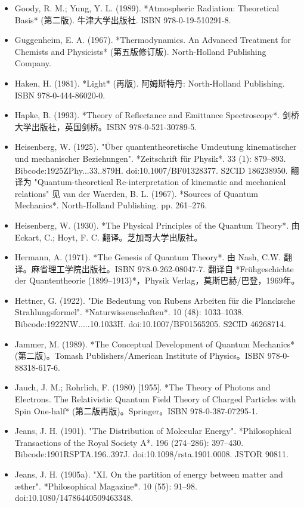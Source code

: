 \begin{itemize}
\item Goody, R. M.; Yung, Y. L. (1989). *Atmospheric Radiation: Theoretical Basis* (第二版). 牛津大学出版社. ISBN 978-0-19-510291-8.  
\item Guggenheim, E. A. (1967). *Thermodynamics. An Advanced Treatment for Chemists and Physicists* (第五版修订版). North-Holland Publishing Company.  
\item Haken, H. (1981). *Light* (再版). 阿姆斯特丹: North-Holland Publishing. ISBN 978-0-444-86020-0.
\item Hapke, B. (1993). *Theory of Reflectance and Emittance Spectroscopy*. 剑桥大学出版社，英国剑桥。ISBN 978-0-521-30789-5.  
\item Heisenberg, W. (1925). "Über quantentheoretische Umdeutung kinematischer und mechanischer Beziehungen". *Zeitschrift für Physik*. 33 (1): 879–893. Bibcode:1925ZPhy...33..879H. doi:10.1007/BF01328377. S2CID 186238950.  
  翻译为 "Quantum-theoretical Re-interpretation of kinematic and mechanical relations" 见 van der Waerden, B. L. (1967). *Sources of Quantum Mechanics*. North-Holland Publishing. pp. 261–276.  
\item Heisenberg, W. (1930). *The Physical Principles of the Quantum Theory*. 由 Eckart, C.; Hoyt, F. C. 翻译。芝加哥大学出版社。  
\item Hermann, A. (1971). *The Genesis of Quantum Theory*. 由 Nash, C.W. 翻译。麻省理工学院出版社。ISBN 978-0-262-08047-7.  
  翻译自 *Frühgeschichte der Quantentheorie (1899–1913)*，Physik Verlag，莫斯巴赫/巴登，1969年。  
\item Hettner, G. (1922). "Die Bedeutung von Rubens Arbeiten für die Plancksche Strahlungsformel". *Naturwissenschaften*. 10 (48): 1033–1038. Bibcode:1922NW.....10.1033H. doi:10.1007/BF01565205. S2CID 46268714.  
\item Jammer, M. (1989). *The Conceptual Development of Quantum Mechanics* (第二版)。Tomash Publishers/American Institute of Physics。ISBN 978-0-88318-617-6.  
\item Jauch, J. M.; Rohrlich, F. (1980) [1955]. *The Theory of Photons and Electrons. The Relativistic Quantum Field Theory of Charged Particles with Spin One-half* (第二版再版)。Springer。ISBN 978-0-387-07295-1.  
\item Jeans, J. H. (1901). "The Distribution of Molecular Energy". *Philosophical Transactions of the Royal Society A*. 196 (274–286): 397–430. Bibcode:1901RSPTA.196..397J. doi:10.1098/rsta.1901.0008. JSTOR 90811.  
\item Jeans, J. H. (1905a). "XI. On the partition of energy between matter and æther". *Philosophical Magazine*. 10 (55): 91–98. doi:10.1080/14786440509463348.  

\end{itemize}
